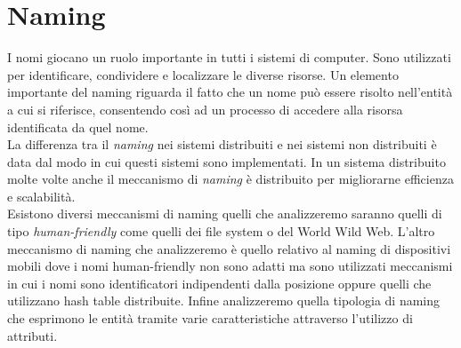\section{Naming}\label{capitolo6}
I nomi giocano un ruolo importante in tutti i sistemi di computer. Sono utilizzati per identificare, condividere e localizzare le diverse risorse. Un elemento importante del naming riguarda il fatto che un nome può essere risolto nell'entità a cui si riferisce, consentendo così ad un processo di accedere alla risorsa identificata da quel nome.\\
La differenza tra il \emph{naming} nei sistemi distribuiti e nei sistemi non distribuiti è data dal modo in cui questi sistemi sono implementati. In un sistema distribuito molte volte anche il meccanismo di \emph{naming} è distribuito per migliorarne efficienza e scalabilità.\\
Esistono diversi meccanismi di naming quelli che analizzeremo saranno quelli di tipo \emph{human-friendly} come quelli dei file system o del World Wild Web. L'altro meccanismo di naming che analizzeremo è quello relativo al naming di dispositivi mobili dove i nomi human-friendly non sono adatti ma sono utilizzati meccanismi in cui i nomi sono identificatori indipendenti dalla posizione oppure quelli che utilizzano hash table distribuite.
Infine analizzeremo quella tipologia di naming che esprimono le entità tramite varie caratteristiche attraverso l'utilizzo di attributi.
